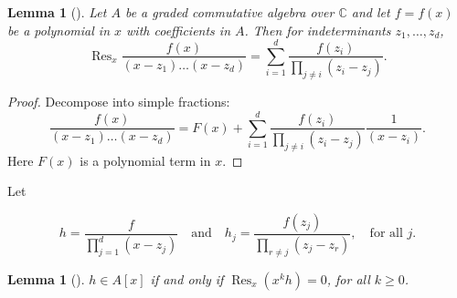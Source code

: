 \documentclass{article}
\newtheorem{lemma}[theorem]{Lemma}
\newcommand{\CC}{\mathbb{C}}
\DeclareMathOperator{\Res}{Res}
\begin{document}
	\begin{lemma}[\cite{Guillemin1999}]\label{residue:1}
		Let $A$ be a graded commutative algebra over $\CC$ and let $f = f(x)$ be a polynomial in $x$ with coefficients in $A$. Then for indeterminants $z_{1}, \ldots, z_{d}$,
		\begin{equation*}
			\Res_{x} \frac{f(x)}{(x - z_{1})\ldots(x - z_{d})} = \sum\limits_{i = 1}^{d}\frac{f(z_{i})}{\prod_{j \neq i}(z_{i} - z_{j})}.
		\end{equation*}
	\end{lemma}
	
	\begin{proof}
		Decompose into simple fractions:
		\begin{equation*}
			\frac{f(x)}{(x - z_{1})\ldots(x - z_{d})} = F(x) + \sum\limits_{i = 1}^{d} \frac{f(z_{i})}{\prod_{j \neq i} (z_{i} - z_{j})} \frac{1}{(x - z_{i})}.
		\end{equation*}
		Here $F(x)$ is a polynomial term in $x$.
	\end{proof}
	
	Let
	
	\begin{equation*}
		h = \frac{f}{ \prod_{j = 1}^{d}(x - z_{j}) } \quad \text{and} \quad h_{j} = \frac{f(z_{j})}{\prod_{r \neq j}(z_{j} - z_{r})}, \quad \text{for all } j.
	\end{equation*}
	
	\begin{lemma}[\cite{Guillemin1999}]\label{residue:2}
		$h \in A[x]$ if and only if $\Res_{x}(x^{k}h) = 0$, for all $k \geq 0$.
	\end{lemma}
	
\end{document}
